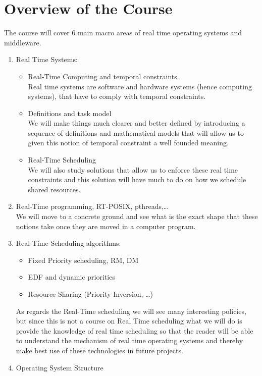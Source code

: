\section*{Overview of the Course}
The course will cover 6 main macro areas of real time operating systems and middleware.
\begin{enumerate}
    \item Real Time Systems:
    \begin{itemize}
        \item Real-Time Computing and temporal constraints.\\
        Real time systems are software and hardware systems (hence computing systems), that have to comply with temporal constraints.
        \item Definitions and task model\\
        We will make things much clearer and better defined by introducing a sequence of definitions and mathematical models that will allow us to given this notion of temporal constraint a well founded meaning.
        \item Real-Time Scheduling\\
        We will also study solutions that allow us to enforce these real time constraints and this solution will have much to do on how we schedule shared resources.
    \end{itemize}
    \item Real-Time programming, RT-POSIX, pthreads,\dots\\
    We will move to a concrete ground and see what is the exact shape that these notions take once they are moved in a computer program. 
    \item Real-Time Scheduling algorithms:
    \begin{itemize}
        \item Fixed Priority scheduling, RM, DM
        \item EDF and dynamic priorities
        \item Resource Sharing (Priority Inversion, \dots)
    \end{itemize}
    As regards the Real-Time scheduling we will see many interesting policies, but since this is not a course on Real Time scheduling what we will do is provide the knowledge of real time scheduling so that the reader will be able to understand the mechanism of real time operating systems and thereby make best use of these technologies in future projects.
    \item Operating System Structure

\end{enumerate}
